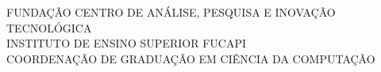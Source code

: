 \documentclass[
	12pt,				%
	openright,			%
	twoside,			%
	a4paper,			%
	chapter=TITLE,		%
	section=TITLE,		%
	english,			%
	french,				%
	spanish,			%
	brazil				%
	]{abntex2}
\begin{document}
\frenchspacing 


\renewcommand{\imprimircapa}{%
	\begin{capa}%
		\center
		\ABNTEXchapterfont\Large FUNDAÇÃO CENTRO DE ANÁLISE, PESQUISA E INOVAÇÃO TECNOLÓGICA\\ INSTITUTO DE ENSINO SUPERIOR FUCAPI\\ COORDENAÇÃO DE GRADUAÇÃO EM CIÊNCIA DA COMPUTAÇÃO
	
		\vspace*{1cm}
	
		{\ABNTEXchapterfont\large\imprimirautor}
	
		\vfill
		\ABNTEXchapterfont\bfseries\LARGE\imprimirtitulo
		\vfill
	
		\large\imprimirlocal
	
		\large\imprimirdata
	
		\vspace*{1cm}
	\end{capa}
}

\imprimircapa


\imprimirfolhaderosto*


%
%     
	
\end{document}
